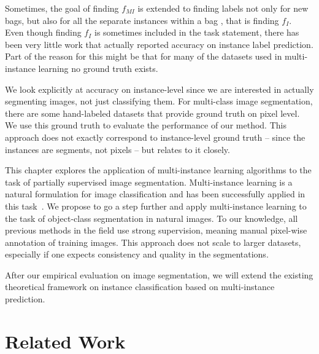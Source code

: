 Sometimes, the goal of finding $f_{MI}$ is extended to finding labels not only
for new bags, but also for all the separate instances within a bag
\citep{liconvex2010,zha2008joint}, that is finding $f_{I}$.\\ 
Even though finding $f_{I}$ is sometimes included in the task statement, there
has been very little work that actually reported accuracy on instance label
prediction. Part of the reason for this might be that for many of the datasets
used in multi-instance learning no ground truth exists.

We look explicitly at accuracy on instance-level since we are interested in
actually segmenting images, not just classifying them. For multi-class image
segmentation, there are some hand-labeled datasets that provide ground truth
on pixel level. We use this ground truth to evaluate the performance of our
method. This approach does not exactly correspond to instance-level ground truth --
since the instances are segments, not pixels -- but relates to it closely.


This chapter explores the 
application of multi-instance learning algorithms to the task of partially supervised image segmentation.
Multi-instance learning is a natural formulation for image classification and has been
successfully applied in this task~\citep{zhou2007multi}. We propose to go a step further and apply
multi-instance learning to the task of object-class segmentation in natural
images.
To our knowledge, all previous methods in the field use strong
supervision, meaning manual pixel-wise annotation of training images. This
approach does not scale to larger datasets, especially if one expects
consistency and quality in the segmentations.

After our empirical evaluation on image segmentation, we will extend the existing theoretical framework
on instance classification based on multi-instance prediction.

\section{Related Work}
